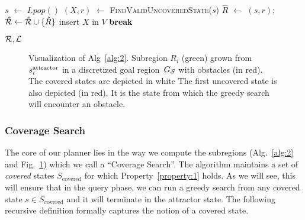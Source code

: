 \documentclass[a4paper]{report}
\begin{document}
\begin{algorithm}[t]
\begin{algorithmic}[1]
\vspace{2mm}        
        
         \label{alg:1:iv_loop}
            \State $s$ $\leftarrow$ $I.pop()$
            
\State $(X, r)$ $\leftarrow$ \textsc{FindValidUncoveredState}($s$)
                \State $\hat{R}$ $\leftarrow$ $(s,r)$;
        \hspace{2mm}
        $\hat{\mathcal{R}} \leftarrow \hat{\mathcal{R}} \cup \{ \hat{R} \}$   \label{alg:1:iv_region}
                    \label{alg:1:x_states}
                    \State insert $X$ in $V$
                    \State \textbf{break} \label{alg:1:break}
                \EndIf
            \EndIf
        \EndWhile
    \EndWhile

  \vspace{2mm}

  \State \Return $\mathcal{R}, \mathcal{L}$
\EndProcedure
\end{algorithmic}
\end{algorithm}

\begin{figure}[tb]
  \centering
  \caption{
  Visualization of Alg~\ref{alg:2}. Subregion $R_i$ (green) grown from $s^{\text{attractor}}_i$ in a discretized goal region~$G_\mathcal{S}$ with obstacles (in red). The covered states are depicted in white
  The first uncovered state is also depicted (in red). It is the state from which the greedy search will encounter an obstacle.
}
    \label{fig:alg2}
\end{figure}

\subsubsection{Coverage Search}
The core of our planner lies in the way we compute the subregions (Alg.~\ref{alg:2} and Fig.~\ref{fig:alg2}) which we call a ``Coverage Search''. The algorithm maintains a set of \emph{covered} states $S_{\text{covered}}$ for which Property~\ref{property:1} holds.
As we will see, this will ensure that in the query phase, we can run a greedy search from any covered state $s \in S_{\text{covered}}$ and it will terminate in the attractor state. 
%
The following recursive definition formally captures the notion of a covered state.
\end{document}
